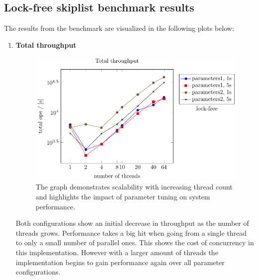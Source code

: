 \documentclass{article}
\begin{document}
\subsection{Lock-free skiplist benchmark results}
The results from the benchmark are visualized in the following plots below:
\begin{enumerate}
    \item \textbf{Total throughput}
    \begin{figure}[H]
        \centering
        \includegraphics{../plots/lock_free_throughput.pdf}
        \caption{The graph demonstrates scalability with increasing thread count and highlights the impact of parameter tuning on system performance.}
       
        \label{fig:lock_free_throughput}
    \end{figure}
    Both configurations show an initial decrease in throughput as the number of threads grows. Performance takes a big hit when going from a single thread to only a small number of parallel ones. This shows the cost of concurrency in this implementation. However with a larger amount of threads the implementation begins to gain performance again over all parameter configurations. 


\end{enumerate}
\end{document}
